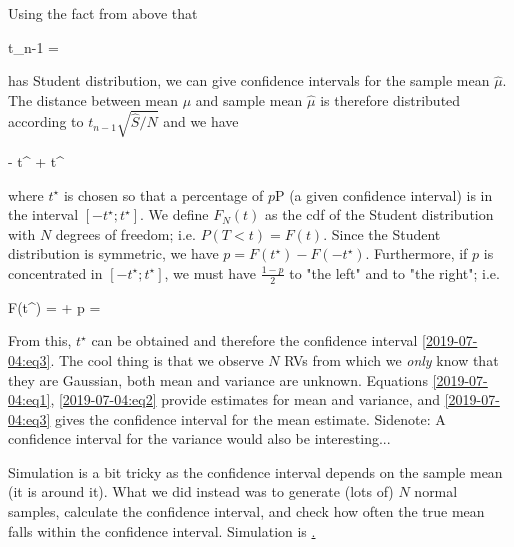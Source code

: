 Using the fact from above that 

\bee
t_{n-1} = 
\eee

has Student distribution, we can give confidence intervals for the sample mean $\hat \mu$. The distance between mean $\mu$ and sample mean $\hat \mu$ is therefore distributed according to $t_{n-1} \sqrt{\hat S / N}$ and we have

\be\label{2019-07-04:eq3}
\hat \mu - t^\star {} \leq \mu \leq \hat \mu + t^\star {}
\ee

where $t^\star$ is chosen so that a percentage of $p$P (a given confidence interval) is in the interval $[-t^\star; t^\star]$. We define $F_N(t)$ as the cdf of the Student distribution with $N$ degrees of freedom; i.e. $P(T<t) = F(t)$. Since the Student distribution is symmetric, we have $p = F(t^\star) - F(-t^\star)$. Furthermore, if $p$ is concentrated in $[-t^\star; t^\star]$, we must have $\frac{1-p}{2}$ to "the left" and to "the right"; i.e.

\bee
F(t^\star) =  + p = 
\eee

From this, $t^\star$ can be obtained and therefore the confidence interval \eqref{2019-07-04:eq3}. The cool thing is that we observe $N$ RVs from which we \emph{only} know that they are Gaussian, both mean and variance are unknown. Equations \eqref{2019-07-04:eq1}, \eqref{2019-07-04:eq2} provide estimates for mean and variance, and \eqref{2019-07-04:eq3} gives the confidence interval for the mean estimate. Sidenote: A confidence interval for the variance would also be interesting...

Simulation is a bit tricky as the confidence interval depends on the sample mean (it is around it). What we did instead was to generate (lots of) $N$ normal samples, calculate the confidence interval, and check how often the true mean falls within the confidence interval. Simulation is \href{https://github.com/ClemensFMN/JuliaStuff/blob/master/stochastic/student_3.jl}.



